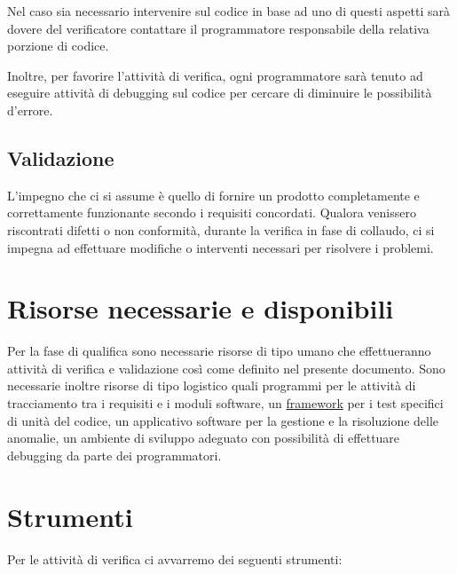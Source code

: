 Nel caso sia necessario intervenire sul codice in base ad uno di questi aspetti
sar\`a dovere del verificatore contattare il programmatore responsabile della
relativa porzione di codice.

Inoltre, per favorire l'attivit\`a di verifica, ogni programmatore sar\`a tenuto
ad eseguire attivit\`a di debugging sul codice per cercare di diminuire le
possibilit\`a d'errore.

\subsection{Validazione}

L'impegno che ci si assume \`e quello di fornire un prodotto completamente e
correttamente funzionante secondo i requisiti concordati. Qualora venissero
riscontrati difetti o non conformit\`a, durante la verifica in fase di collaudo,
ci si impegna ad effettuare modifiche o interventi necessari per risolvere i
problemi.

\section{Risorse necessarie e disponibili}

Per la fase di qualifica sono necessarie risorse di tipo umano che
effettueranno attivit\`a di verifica e validazione cos\`i come definito nel
presente documento. Sono necessarie inoltre risorse di tipo logistico quali
programmi per le attivit\`a di tracciamento tra i requisiti e i moduli software,
un \underline{framework} per i test specifici di unit\`a del codice, un
applicativo software per la gestione e la risoluzione delle anomalie, un ambiente di sviluppo
adeguato con possibilit\`a di effettuare debugging da parte dei programmatori.


\section{Strumenti}

Per le attivit\`a di verifica ci avvarremo dei seguenti strumenti:

